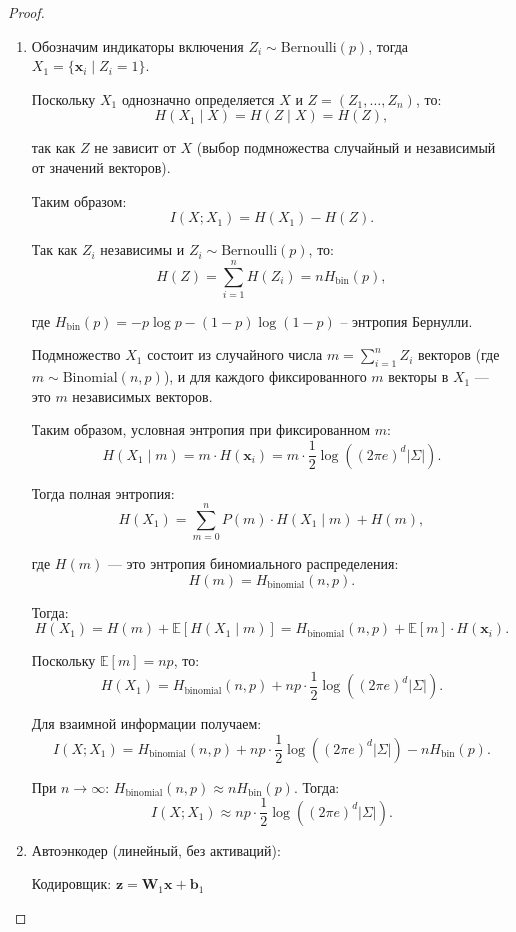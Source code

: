 \documentclass[a4paper, 14pt]{article}
\begin{document}
\begin{proof}
\begin{enumerate}
    \item Обозначим индикаторы включения $Z_i \sim \text{Bernoulli}(p)$, тогда $X_1 = \{ \mathbf{x}_i \mid Z_i = 1 \}$.

Поскольку $X_1$ однозначно определяется $X$ и $Z = (Z_1, \dots, Z_n)$, то:
\[H(X_1 \mid X) = H(Z \mid X) = H(Z),\]

так как $Z$ не зависит от $X$ (выбор подмножества случайный и независимый от значений векторов).

Таким образом:
\[I(X; X_1) = H(X_1) - H(Z).\]

Так как $Z_i$ независимы и $Z_i \sim \text{Bernoulli}(p)$, то:
\[H(Z) = \sum_{i=1}^n H(Z_i) = n H_{\text{bin}}(p),\]

\noindent где $H_{\text{bin}}(p) = -p \log p - (1-p) \log (1-p)$ -- энтропия Бернулли.

Подмножество $X_1$ состоит из случайного числа $m = \sum_{i=1}^n Z_i$ векторов (где $m \sim \text{Binomial}(n, p)$), и для каждого фиксированного $m$ векторы в $X_1$ — это $m$ независимых векторов.  

Таким образом, условная энтропия при фиксированном $m$:
\[H(X_1 \mid m) = m \cdot H(\mathbf{x}_i) = m \cdot \frac{1}{2} \log \left( (2 \pi e)^d |\Sigma| \right).\]

Тогда полная энтропия:
\[H(X_1) = \sum_{m=0}^n P(m) \cdot H(X_1 \mid m) + H(m),\]

\noindent где $H(m)$ — это энтропия биномиального распределения:
\[H(m) = H_{\text{binomial}}(n, p).\]

Тогда:
\[H(X_1) = H(m) + \mathbb{E}[H(X_1 \mid m)] = H_{\text{binomial}}(n, p) + \mathbb{E}[m] \cdot H(\mathbf{x}_i).\]

Поскольку $\mathbb{E}[m] = np$, то:
\[H(X_1) = H_{\text{binomial}}(n, p) + np \cdot \frac{1}{2} \log \left( (2\pi e)^d |\Sigma| \right).\]

Для взаимной информации получаем:
\[I(X; X_1) = H_{\text{binomial}}(n, p) + n p \cdot \frac{1}{2} \log \left( (2 \pi e)^d |\Sigma| \right) - n H_{\text{bin}}(p).\]

При $n \to \infty$: $H_{\text{binomial}}(n, p) \approx n H_{\text{bin}}(p)$. Тогда:
\[I(X; X_1) \approx np \cdot \frac{1}{2} \log \left( (2 \pi e)^d |\Sigma| \right).\]

    \item Автоэнкодер (линейный, без активаций):

Кодировщик: $\mathbf{z} = \mathbf{W}_1 \mathbf{x} + \mathbf{b}_1$


\end{enumerate}
\end{proof}
\end{document}
